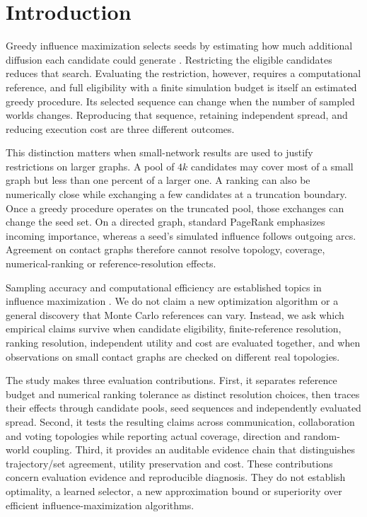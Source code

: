 \documentclass[smallextended]{svjour3}
\begin{document}
\section{Introduction}
Greedy influence maximization selects seeds by estimating how much additional diffusion each candidate could generate \cite{ref1}. Restricting the eligible candidates reduces that search. Evaluating the restriction, however, requires a computational reference, and full eligibility with a finite simulation budget is itself an estimated greedy procedure. Its selected sequence can change when the number of sampled worlds changes. Reproducing that sequence, retaining independent spread, and reducing execution cost are three different outcomes.

This distinction matters when small-network results are used to justify restrictions on larger graphs. A pool of $4k$ candidates may cover most of a small graph but less than one percent of a larger one. A ranking can also be numerically close while exchanging a few candidates at a truncation boundary. Once a greedy procedure operates on the truncated pool, those exchanges can change the seed set. On a directed graph, standard PageRank emphasizes incoming importance, whereas a seed's simulated influence follows outgoing arcs. Agreement on contact graphs therefore cannot resolve topology, coverage, numerical-ranking or reference-resolution effects.

Sampling accuracy and computational efficiency are established topics in influence maximization \cite{ref2,ref8,ref9,ref16}. We do not claim a new optimization algorithm or a general discovery that Monte Carlo references can vary. Instead, we ask which empirical claims survive when candidate eligibility, finite-reference resolution, ranking resolution, independent utility and cost are evaluated together, and when observations on small contact graphs are checked on different real topologies.

The study makes three evaluation contributions. First, it separates reference budget and numerical ranking tolerance as distinct resolution choices, then traces their effects through candidate pools, seed sequences and independently evaluated spread. Second, it tests the resulting claims across communication, collaboration and voting topologies while reporting actual coverage, direction and random-world coupling. Third, it provides an auditable evidence chain that distinguishes trajectory/set agreement, utility preservation and cost. These contributions concern evaluation evidence and reproducible diagnosis. They do not establish optimality, a learned selector, a new approximation bound or superiority over efficient influence-maximization algorithms.
\end{document}
